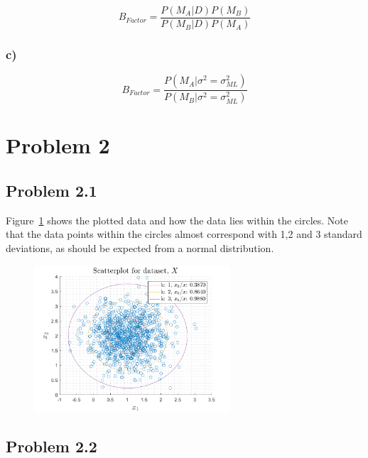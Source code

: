 \documentclass{article}
\begin{document}
\begin{equation}
B_{Factor} = \frac{P(M_A|D)P(M_B) }{P(M_B|D)P(M_A)}
\end{equation}



\subsubsection*{c)}

\begin{equation}
B_{Factor}=\frac{P(M_A|\sigma^2=\sigma_{ML}^2)}{P(M_B|\sigma^2=\sigma_{ML}^2)}
\end{equation}

\newpage 

\section*{Problem 2}
\subsection*{Problem 2.1}
Figure~\ref{fig:prob21} shows the plotted data and how the data lies within the circles. Note that the data points within the circles almost correspond with 1,2 and 3 standard deviations, as should be expected from a normal distribution. 
\begin{figure}[H]
	\centering
	\includegraphics[width=0.65\textwidth]{Figures/plot2_1_scatter.png}
	\caption{\label{fig:prob21}}
\end{figure}

\subsection*{Problem 2.2}
\end{document}

